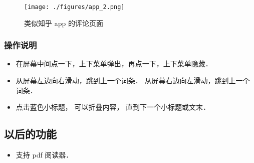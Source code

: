 \begin{figure}[ht]
\centering
\texttt{[image: ./figures/app\_2.png]}
\caption{类似知乎 app 的评论页面} \label{app_fig2}
\end{figure}

\subsubsection{操作说明}
\begin{itemize}
\item 在屏幕中间点一下，上下菜单弹出，再点一下，上下菜单隐藏．
\item 从屏幕左边向右滑动，跳到上一个词条． 从屏幕右边向左滑动，跳到上一个词条．
\item 点击蓝色小标题， 可以折叠内容， 直到下一个小标题或文末．
\end{itemize}

\subsection{以后的功能}
\begin{itemize}
\item 支持 pdf 阅读器．
\end{itemize}
